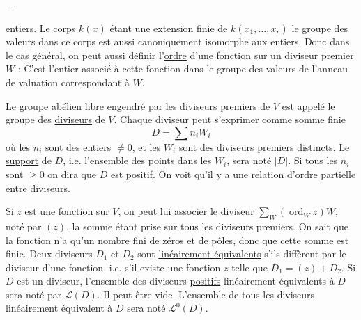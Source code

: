 -  -

entiers. Le corps $k(x)$ étant une extension finie de $k(x_1,\ldots,x_r)$ le groupe des valeurs dans ce corps est aussi canoniquement isomorphe aux entiers. Donc dans le cas général, on peut aussi définir l'\uline{ordre} d'une fonction sur un diviseur premier $W$ : C'est l'entier associé à cette fonction dans le groupe des valeurs de l'anneau de valuation correspondant à $W$.

Le groupe abélien libre engendré par les diviseurs premiers de $V$ est appelé le groupe des \uline{diviseurs} de $V$. Chaque diviseur peut s'exprimer comme somme finie
\[
D=\sum n_iW_i
\]
où les $n_i$ sont des entiers $\ne 0$, et les $W_i$ sont des diviseurs premiers distincts. Le \uline{support} de $D$, i.e. l'ensemble des points dans les $W_i$, sera noté $|D|$. Si tous les $n_i$ sont $\geq 0$ on dira que $D$ est \uline{positif}. On voit qu'il y a une relation d'ordre partielle entre diviseurs.

Si $z$ est une fonction sur $V$, on peut lui associer le diviseur $\sum_W(\operatorname{ord}_Wz)W$, noté par $(z)$, la somme étant prise sur tous les diviseurs premiers. On sait que la fonction n'a qu'un nombre fini de zéros et de pôles, donc que cette somme est finie. Deux diviseurs $D_1$ et $D_2$ sont \uline{linéairement équivalents} s'ils diffèrent par le diviseur d'une fonction, i.e. s'il existe une fonction $z$ telle que $D_1=(z)+D_2$. Si $D$ est un diviseur, l'ensemble des diviseurs \uline{positifs} linéairement équivalents à $D$ sera noté par $\mathcal{L}(D)$. Il peut être vide. L'ensemble de tous les diviseurs linéairement équivalent à $D$ sera noté $\mathcal{L}^0(D)$.
